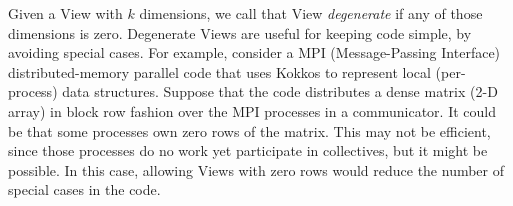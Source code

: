 Given a View with $k$ dimensions, we call that View \emph{degenerate}
if any of those dimensions is zero.  Degenerate Views are useful for
keeping code simple, by avoiding special cases.  For example, consider
a MPI (Message-Passing Interface) distributed-memory parallel code
that uses Kokkos to represent local (per-process) data structures.
Suppose that the code distributes a dense matrix (2-D array) in block
row fashion over the MPI processes in a communicator.  It could be
that some processes own zero rows of the matrix.  This may not be
efficient, since those processes do no work yet participate in
collectives, but it might be possible.  In this case, allowing Views
with zero rows would reduce the number of special cases in the code.
